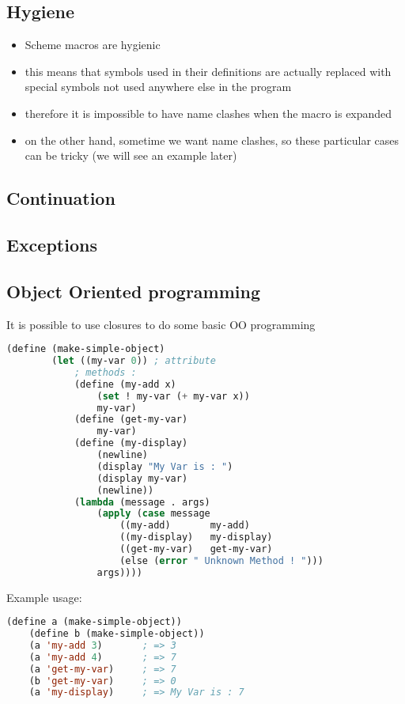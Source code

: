 \subsection{Hygiene}
\begin{itemize}
    \item Scheme macros are hygienic
    \item this means that symbols used in their definitions are actually replaced with special symbols not used anywhere else in the program
    \item therefore it is impossible to have name clashes when the macro is expanded
    \item on the other hand, sometime we want name clashes, so these particular cases can be tricky (we will see an example later)
\end{itemize}

    
\subsection{Continuation}


\subsection{Exceptions}

\subsection{Object Oriented programming}
It is possible to use closures to do some basic OO programming
\begin{lstlisting}[language=Lisp]
    (define (make-simple-object)
        (let ((my-var 0)) ; attribute
            ; methods :
            (define (my-add x)
                (set ! my-var (+ my-var x))
                my-var)
            (define (get-my-var)
                my-var)
            (define (my-display)
                (newline)
                (display "My Var is : ")
                (display my-var)
                (newline))
            (lambda (message . args)
                (apply (case message
                    ((my-add)       my-add)
                    ((my-display)   my-display)
                    ((get-my-var)   get-my-var)
                    (else (error " Unknown Method ! ")))
                args))))
\end{lstlisting}
Example usage:
\begin{lstlisting}[language=Lisp]
    (define a (make-simple-object))
    (define b (make-simple-object))
    (a 'my-add 3)       ; => 3
    (a 'my-add 4)       ; => 7
    (a 'get-my-var)     ; => 7
    (b 'get-my-var)     ; => 0
    (a 'my-display)     ; => My Var is : 7
\end{lstlisting}

